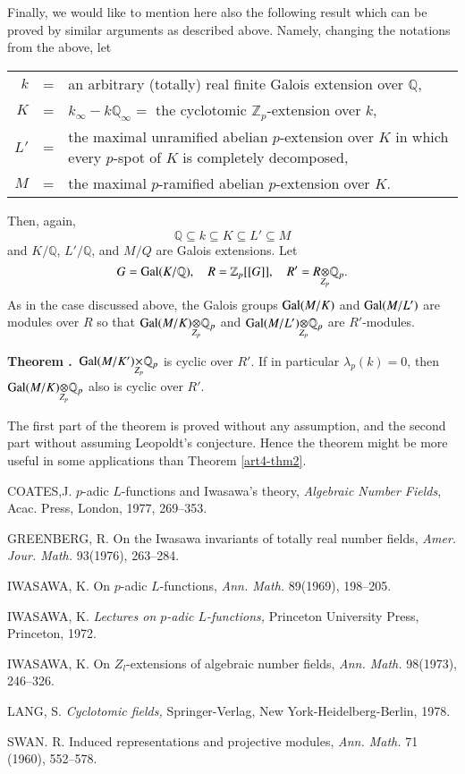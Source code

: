 Finally, we would like to mention here also the following result which can be proved by similar arguments as described above. Namely, changing the notations from the above, let
\begin{center}
\begin{tabular}{r@{\;}c@{\;}p{8.5cm}}
$k$ & = & an arbitrary (totally) real finite Galois extension over $\mathbb{Q}$,\\
$K$ & = & $k_{\infty}-k\mathbb{Q}_{\infty}=$ the cyclotomic $\mathbb{Z}_{p}$-extension over $k$,\\
$L'$ & = & the maximal unramified abelian $p$-extension over $K$ in which every $p$-spot of $K$ is completely decomposed,\\
$M$ & = & the maximal $p$-ramified abelian $p$-extension over $K$.
\end{tabular}
\end{center}
Then, again,
$$
\mathbb{Q}\subseteq k\subseteq K\subseteq L'\subseteq M
$$
and $K/\mathbb{Q}$, $L'/\mathbb{Q}$, and $M/Q$ are Galois extensions. Let
$$
G=\Gal(K/\mathbb{Q}),\quad R=\mathbb{Z}_{p}[[G]],\quad R'=\foprod{R}{\mathbb{Q}_{p}}{Z_{p}}.
$$
As in the case discussed above, the Galois groups $\operatorname{Gal}(M/K)$ and $\operatorname{Gal}(M/L')$ are modules over $R$ so that $\foprod{\Gal(M/K)}{\mathbb{Q}_{p}}{Z_{p}}$ and $\foprod{\Gal(M/L')}{\mathbb{Q}_{p}}{Z_{p}}$ are $R'$-modules.

\medskip
\noindent
{\bf Theorem .\label{art4-thm4}}~{$\fprod{\Gal(M/K')}{\mathbb{Q}_{p}}{Z_{p}}$ is cyclic over $R'$. If in particular $\lambda_{p}(k)=0$, then $\foprod{\Gal(M/K)}{\mathbb{Q}_{p}}{Z_{p}}$ also is cyclic over $R'$.}
\medskip

The first part of the theorem is proved without any assumption, and the second part without assuming Leopoldt's conjecture. Hence the theorem might be more useful in some applications than Theorem \ref{art4-thm2}.

\begin{thebibliography}{99}
 COATES,\pageoriginale J. $p$-adic $L$-functions and Iwasawa's theory, {\em Algebraic Number Fields}, Acac. Press, London, 1977, 269--353.

 GREENBERG, R. On the Iwasawa invariants of totally real number fields, {\em Amer. Jour. Math.} 93(1976), 263--284.

 IWASAWA, K. On $p$-adic $L$-functions, {\em Ann. Math.} 89(1969), 198--205.

 IWASAWA, K. {\em Lectures on $p$-adic $L$-functions,} Princeton University Press, Princeton, 1972.

 IWASAWA, K. On $Z_{l}$-extensions of algebraic number fields, {\em Ann. Math.} 98(1973), 246--326.

 LANG, S. {\em Cyclotomic fields,} Springer-Verlag, New York-Heidelberg-Berlin, 1978.

 SWAN. R. Induced representations and projective modules, {\em Ann. Math.} 71 (1960), 552--578.

\end{thebibliography}
